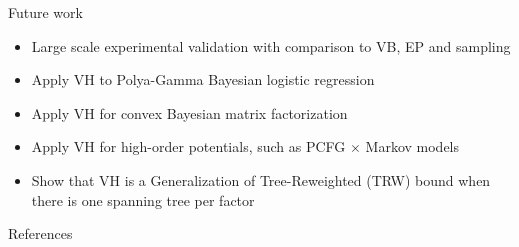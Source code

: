 \documentclass{beamer}
\begin{document}
\begin{frame}{Future work}
	\begin{itemize}
	\item Large scale experimental validation with comparison to VB, EP and sampling
	\item Apply VH to Polya-Gamma Bayesian logistic regression
	\item Apply VH for convex Bayesian matrix factorization		
	\item Apply VH for high-order potentials, such as PCFG $\times$ Markov models			
	\item Show that VH is a Generalization of Tree-Reweighted (TRW) bound when there is one spanning tree per factor
	\end{itemize}
\end{frame}


%
\begin{frame}{References}


\end{frame}
\end{document}
